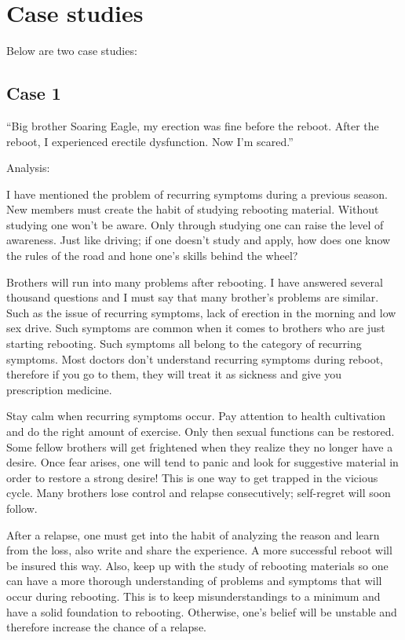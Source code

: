 \documentclass[
]{book}
\begin{document}
\hypertarget{case-studies-2}{%
\section{Case studies}\label{case-studies-2}}

Below are two case studies:

\hypertarget{case-1-2}{%
\subsection{Case 1}\label{case-1-2}}

``Big brother Soaring Eagle, my erection was fine before the reboot. After the reboot, I experienced erectile dysfunction. Now I'm scared.''

Analysis:

I have mentioned the problem of recurring symptoms during a previous season. New members must create the habit of studying rebooting material. Without studying one won't be aware. Only through studying one can raise the level of awareness. Just like driving; if one doesn't study and apply, how does one know the rules of the road and hone one's skills behind the wheel?

Brothers will run into many problems after rebooting. I have answered several thousand questions and I must say that many brother's problems are similar. Such as the issue of recurring symptoms, lack of erection in the morning and low sex drive. Such symptoms are common when it comes to brothers who are just starting rebooting. Such symptoms all belong to the category of recurring symptoms. Most doctors don't understand recurring symptoms during reboot, therefore if you go to them, they will treat it as sickness and give you prescription medicine.

Stay calm when recurring symptoms occur. Pay attention to health cultivation and do the right amount of exercise. Only then sexual functions can be restored. Some fellow brothers will get frightened when they realize they no longer have a desire. Once fear arises, one will tend to panic and look for suggestive material in order to restore a strong desire! This is one way to get trapped in the vicious cycle. Many brothers lose control and relapse consecutively; self-regret will soon follow.

After a relapse, one must get into the habit of analyzing the reason and learn from the loss, also write and share the experience. A more successful reboot will be insured this way. Also, keep up with the study of rebooting materials so one can have a more thorough understanding of problems and symptoms that will occur during rebooting. This is to keep misunderstandings to a minimum and have a solid foundation to rebooting. Otherwise, one's belief will be unstable and therefore increase the chance of a relapse.
\end{document}
